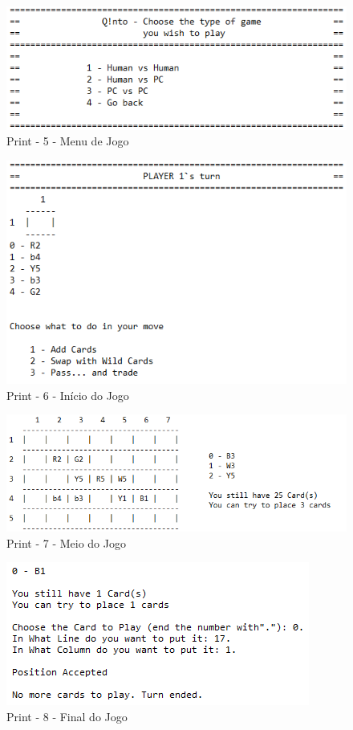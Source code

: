 \documentclass[a4paper]{article}
\begin{document}
	\begin{figure}[ht!]
	\centering
	\includegraphics[scale = 1]{./res/print7.png}
	\caption{Print - 5 -  Menu de Jogo \label{Print - 5}}
	\end{figure}

	\begin{figure}[ht!]
	\centering
	\includegraphics[scale = 1]{./res/print8.png}
	\caption{Print - 6 - Início do Jogo \label{Print - 6}}
	\end{figure}

	\begin{figure}[ht!]
	\centering
	\includegraphics[scale = 1]{./res/print1.png}
	\caption{Print - 7 - Meio do Jogo \label{Print - 7}}
	\end{figure}

	\begin{figure}[ht!]
	\centering
	\includegraphics[scale = 1]{./res/print4.png}
	\caption{Print - 8 - Final do Jogo \label{Print - 8}}
	\end{figure}
\end{document}
